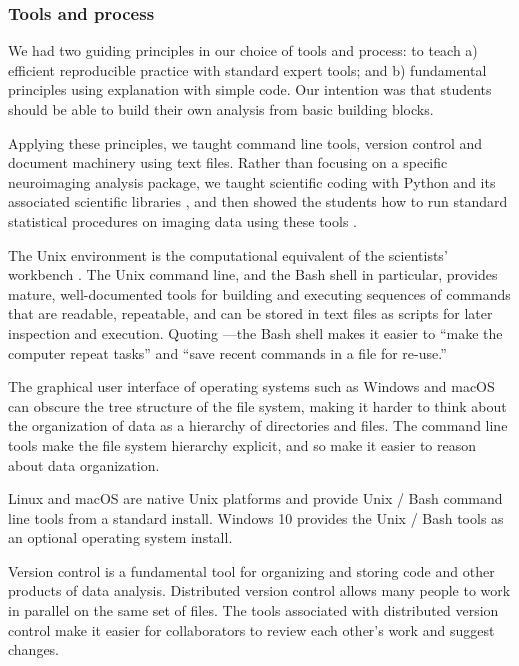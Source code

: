 \subsubsection{Tools and process}

We had two guiding principles in our choice of tools and process: to teach a)
efficient reproducible practice with standard expert tools; and b) fundamental
principles using explanation with simple code.  Our intention was that students
should be able to build their own analysis from basic building blocks.

Applying these principles, we taught command line tools, version control and
document machinery using text files.  Rather than focusing on a specific
neuroimaging analysis package, we taught scientific coding with Python and its
associated scientific libraries \citep{millman2011python, perez2011python}, and
then showed the students how to run standard statistical procedures on imaging
data using these tools \citep{millman2007analysis}.

The Unix environment is the computational equivalent of the scientists'
workbench \citep{preeyanon2014reproducible}.  The Unix command line, and the
Bash shell in particular, provides mature, well-documented tools for building
and executing sequences of commands that are readable, repeatable, and can be
stored in text files as scripts for later inspection and execution.  Quoting
\cite{wilson2014best}---the Bash shell makes it easier to ``make the computer
repeat tasks'' and ``save recent commands in a file for re-use.''

The graphical user interface of operating systems such as Windows and macOS
can obscure the tree structure of the file system, making it harder to think
about the organization of data as a hierarchy of directories and files.  The
command line tools make the file system hierarchy explicit, and so make it
easier to reason about data organization.

Linux and macOS are native Unix platforms and provide Unix / Bash command line
tools from a standard install.  Windows 10 provides the Unix / Bash tools as
an optional operating system install.

Version control is a fundamental tool for organizing and storing code and
other products of data analysis.
Distributed version control allows many people to work in parallel on the
same set of files.
The tools associated with distributed version control make it easier for
collaborators to review each other's work and suggest changes.


